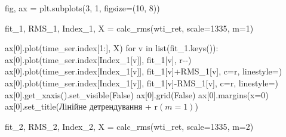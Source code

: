 \documentclass[
  letterpaper,
]{report}
\newenvironment{Shaded}{\begin{snugshade}}{\end{snugshade}}
\newcommand{\BuiltInTok}[1]{\textcolor[rgb]{0.00,0.23,0.31}{#1}}
\newcommand{\ControlFlowTok}[1]{\textcolor[rgb]{0.00,0.23,0.31}{#1}}
\newcommand{\DecValTok}[1]{\textcolor[rgb]{0.68,0.00,0.00}{#1}}
\newcommand{\KeywordTok}[1]{\textcolor[rgb]{0.00,0.23,0.31}{#1}}
\newcommand{\NormalTok}[1]{\textcolor[rgb]{0.00,0.23,0.31}{#1}}
\newcommand{\OperatorTok}[1]{\textcolor[rgb]{0.37,0.37,0.37}{#1}}
\newcommand{\StringTok}[1]{\textcolor[rgb]{0.13,0.47,0.30}{#1}}
\newcommand{\VariableTok}[1]{\textcolor[rgb]{0.07,0.07,0.07}{#1}}
\newcommand{\VerbatimStringTok}[1]{\textcolor[rgb]{0.13,0.47,0.30}{#1}}
\begin{document}
\begin{Shaded}
\begin{Highlighting}[]
\NormalTok{fig, ax }\OperatorTok{=}\NormalTok{ plt.subplots(}\DecValTok{3}\NormalTok{, }\DecValTok{1}\NormalTok{, figsize}\OperatorTok{=}\NormalTok{(}\DecValTok{10}\NormalTok{, }\DecValTok{8}\NormalTok{))}

\NormalTok{fit\_1, RMS\_1, Index\_1, X }\OperatorTok{=}\NormalTok{ calc\_rms(wti\_ret, scale}\OperatorTok{=}\DecValTok{1335}\NormalTok{, m}\OperatorTok{=}\DecValTok{1}\NormalTok{)}

\NormalTok{ax[}\DecValTok{0}\NormalTok{].plot(time\_ser.index[}\DecValTok{1}\NormalTok{:], X)}
\ControlFlowTok{for}\NormalTok{ v }\KeywordTok{in} \BuiltInTok{list}\NormalTok{(fit\_1.keys()):}
\NormalTok{    ax[}\DecValTok{0}\NormalTok{].plot(time\_ser.index[Index\_1[v]], fit\_1[v], }\StringTok{\textquotesingle{}r{-}{-}\textquotesingle{}}\NormalTok{)}
\NormalTok{    ax[}\DecValTok{0}\NormalTok{].plot(time\_ser.index[Index\_1[v]], fit\_1[v]}\OperatorTok{+}\NormalTok{RMS\_1[v], c}\OperatorTok{=}\StringTok{\textquotesingle{}r\textquotesingle{}}\NormalTok{, linestyle}\OperatorTok{=}\StringTok{\textquotesingle{}{-}\textquotesingle{}}\NormalTok{)}
\NormalTok{    ax[}\DecValTok{0}\NormalTok{].plot(time\_ser.index[Index\_1[v]], fit\_1[v]}\OperatorTok{{-}}\NormalTok{RMS\_1[v], c}\OperatorTok{=}\StringTok{\textquotesingle{}r\textquotesingle{}}\NormalTok{, linestyle}\OperatorTok{=}\StringTok{\textquotesingle{}{-}\textquotesingle{}}\NormalTok{)}
\NormalTok{ax[}\DecValTok{0}\NormalTok{].get\_xaxis().set\_visible(}\VariableTok{False}\NormalTok{)}
\NormalTok{ax[}\DecValTok{0}\NormalTok{].grid(}\VariableTok{False}\NormalTok{)}
\NormalTok{ax[}\DecValTok{0}\NormalTok{].margins(x}\OperatorTok{=}\DecValTok{0}\NormalTok{)}
\NormalTok{ax[}\DecValTok{0}\NormalTok{].set\_title(}\StringTok{\textquotesingle{}Лінійне детрендування \textquotesingle{}} \OperatorTok{+} \VerbatimStringTok{r\textquotesingle{}$(m=1)$\textquotesingle{}}\NormalTok{)}

\NormalTok{fit\_2, RMS\_2, Index\_2, X }\OperatorTok{=}\NormalTok{ calc\_rms(wti\_ret, scale}\OperatorTok{=}\DecValTok{1335}\NormalTok{, m}\OperatorTok{=}\DecValTok{2}\NormalTok{)}


\end{Highlighting}
\end{Shaded}
\end{document}
